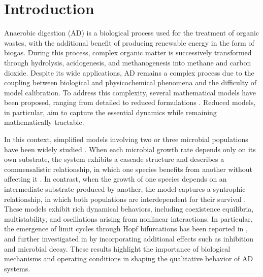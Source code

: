 \documentclass[runningheads]{llncs}
\begin{document}
\section{Introduction}                \label{SecIntro}
Anaerobic digestion (AD) is a biological process used for the treatment of organic wastes, with the additional benefit of producing renewable energy in the form of biogas. During this process, complex organic matter is successively transformed through hydrolysis, acidogenesis, and methanogenesis into methane and carbon dioxide.
Despite its wide applications, AD remains a complex process due to the coupling between biological and physicochemical phenomena and the difficulty of model calibration. To address this complexity, several mathematical models have been proposed, ranging from detailed to reduced formulations \cite{BernardBB2001,SariMB2017}. Reduced models, in particular, aim to capture the essential dynamics while remaining mathematically tractable.

In this context, simplified models involving two or three microbial populations have been widely studied \cite{SariMB2016,SariMB2017}. When each microbial growth rate depends only on its own substrate, the system exhibits a cascade structure and describes a commensalistic relationship, in which one species benefits from another without affecting it \cite{BenyahiaJPC2012,BernardBB2001,FekihArima2014,SariProcesses2022,SariNonLinDyn2021}. In contrast, when the growth of one species depends on an intermediate substrate produced by another, the model captures a syntrophic relationship, in which both populations are interdependent for their survival \cite{NouaouraSIAP2021,NouaouraDcDs2021,SariMB2016,SariMB2017}.
These models exhibit rich dynamical behaviors, including coexistence equilibria, multistability, and oscillations arising from nonlinear interactions. In particular, the emergence of limit cycles through Hopf bifurcations has been reported in \cite{SariMB2017}, and further investigated in \cite{NouaouraSIAP2021,NouaouraDcDs2021} by incorporating additional effects such as inhibition and microbial decay. These results highlight the importance of biological mechanisms and operating conditions in shaping the qualitative behavior of AD systems.
\end{document}
